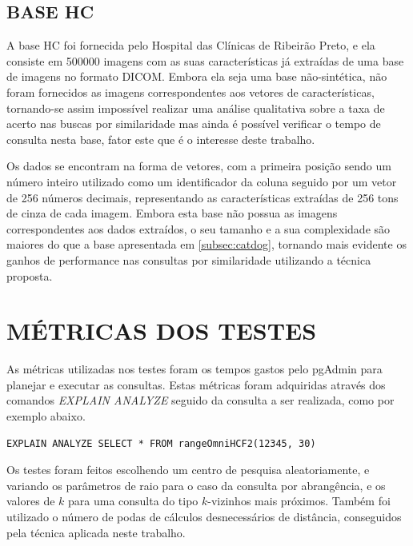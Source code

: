 \subsection{BASE HC}

A base HC foi fornecida pelo Hospital das Clínicas de Ribeirão Preto, e ela consiste em 500000 imagens com as suas características já extraídas de uma base de imagens no formato DICOM. Embora ela seja uma base não-sintética, não foram fornecidos as imagens correspondentes aos vetores de características,
tornando-se assim impossível realizar uma análise qualitativa sobre a taxa de acerto nas buscas por similaridade mas ainda é possível verificar o tempo de consulta nesta base, fator este que é o interesse deste trabalho.

Os dados se encontram na forma de vetores, com a primeira posição sendo um número inteiro utilizado como um identificador da coluna seguido por um vetor de 256 números decimais, representando as características extraídas de 256 tons de cinza de cada imagem. Embora esta base não
possua as imagens correspondentes aos dados extraídos, o seu tamanho e a sua complexidade são maiores do que a base apresentada em \ref{subsec:catdog}, tornando mais evidente os ganhos de performance nas consultas por similaridade utilizando a técnica proposta.


\section{MÉTRICAS DOS TESTES}
\label{sec:metricas}
As métricas utilizadas nos testes foram os tempos gastos pelo pgAdmin para planejar e executar as consultas. Estas métricas foram adquiridas através dos comandos \textit{EXPLAIN ANALYZE} seguido da consulta a ser realizada, como por exemplo abaixo.
\begin{lstlisting}[caption={Exemplo de comando utilizado para a visualização das métricas de performance}, captionpos=t,basicstyle=\tiny]
EXPLAIN ANALYZE SELECT * FROM rangeOmniHCF2(12345, 30)
\end{lstlisting}

Os testes foram feitos escolhendo um centro de pesquisa aleatoriamente, e variando os parâmetros de raio para o caso da consulta por abrangência, e
os valores de $k$ para uma consulta do tipo $k$-vizinhos mais próximos. Também foi utilizado o número de podas de cálculos desnecessários de distância, conseguidos pela técnica aplicada neste trabalho.

